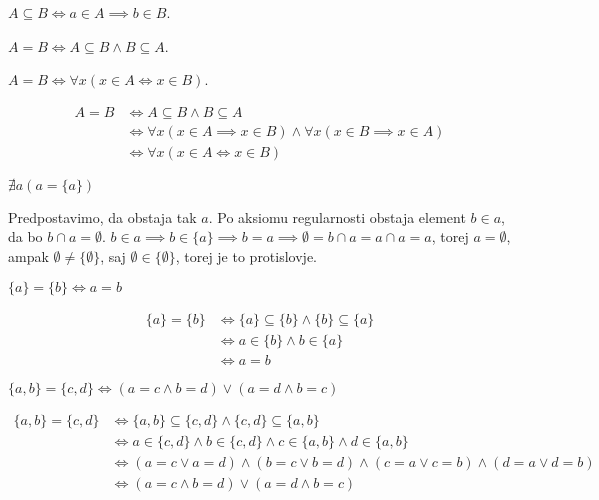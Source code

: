 \begin{definicija}
    $A \subseteq B \iff a \in A \implies b \in B$.
\end{definicija}

\begin{definicija}
    $A = B \iff A \subseteq B \wedge B \subseteq A$.
\end{definicija}

\begin{trditev}
    $A = B \iff \forall x (x \in A \iff x \in B)$.
\end{trditev}
\begin{dokaz}
\begin{align*}
    A = B &\iff A \subseteq B \wedge B \subseteq A \\
    &\iff \forall x (x \in A \implies x \in B) \wedge \forall x (x \in B \implies x \in A) \\
    &\iff \forall x (x \in A \iff x \in B)
\end{align*}
\end{dokaz}

\begin{trditev}
    $\nexists a (a = \{a\})$
\end{trditev}
\begin{dokaz}
    Predpostavimo, da obstaja tak $a$.
    Po aksiomu regularnosti obstaja element $b \in a$, da bo $b \cap a = \emptyset$.
    $b \in a \implies b \in \{a\} \implies b = a \implies \emptyset = b \cap a = a \cap a = a$, torej
    $a = \emptyset$, ampak $\emptyset \neq \{\emptyset\}$, saj $\emptyset \in \{\emptyset\}$, torej je to protislovje.
\end{dokaz}

\begin{trditev}
    $\{a\} = \{b\} \iff a = b$
\end{trditev}
\begin{dokaz}
\begin{align*}
    \{a\} = \{b\} &\iff \{a\} \subseteq \{b\} \wedge \{b\} \subseteq \{a\} \\
    &\iff a \in \{b\} \wedge b \in \{a\} \\
    &\iff a = b
\end{align*}
\end{dokaz}

\begin{trditev}
    $\{a, b\} = \{c, d\} \iff (a = c \wedge b = d) \vee (a = d \wedge b = c)$
\end{trditev}
\begin{dokaz}
\begin{align*}
    \{a, b\} = \{c, d\} &\iff \{a, b\} \subseteq \{c, d\} \wedge \{c, d\} \subseteq \{a, b\} \\
    &\iff a \in \{c, d\} \wedge b \in \{c, d\} \wedge c \in \{a, b\} \wedge d \in \{a, b\} \\
    &\iff (a = c \vee a = d) \wedge (b = c \vee b = d) \wedge (c = a \vee c = b) \wedge (d = a \vee d = b) \\
    &\iff (a = c \wedge b = d) \vee (a = d \wedge b = c)
\end{align*}
\end{dokaz}

